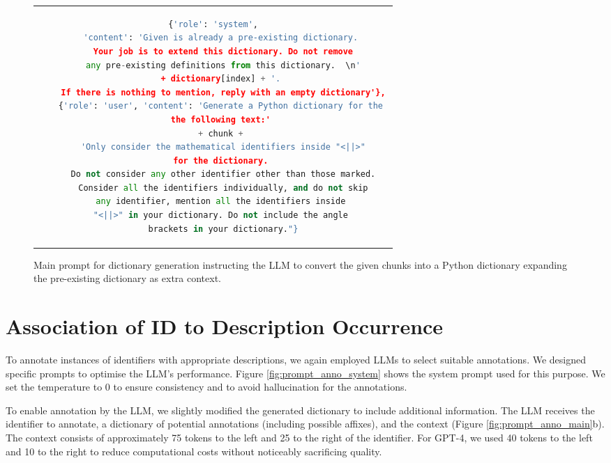 \begin{figure}[htpb]
  \centering
  \begin{tabular}{c}
  \begin{lstlisting}[language=python]
    {'role': 'system',
    'content': 'Given is already a pre-existing dictionary. 
    Your job is to extend this dictionary. Do not remove
    any pre-existing definitions from this dictionary.  \n'
    + dictionary[index] + '. 
    If there is nothing to mention, reply with an empty dictionary'},
    {'role': 'user', 'content': 'Generate a Python dictionary for the 
    the following text:' 
    + chunk + 
    'Only consider the mathematical identifiers inside "<||>"
    for the dictionary. 
    Do not consider any other identifier other than those marked.
    Consider all the identifiers individually, and do not skip
    any identifier, mention all the identifiers inside 
    "<||>" in your dictionary. Do not include the angle 
    brackets in your dictionary."}
  \end{lstlisting}
  \end{tabular}
  \caption[Main Prompt for Dictionary Generation]{Main prompt for dictionary generation instructing the LLM to convert the given chunks into a Python dictionary expanding the pre-existing dictionary as extra context.} \label{fig:prompt_dic}
\end{figure}


\section{Association of ID to Description Occurrence}\label{sec:annotation}

To annotate instances of identifiers with appropriate descriptions, we again employed \ac{LLMs} to select suitable annotations. We designed specific prompts to optimise the LLM's performance. Figure \ref{fig:prompt_anno_system} shows the system prompt used for this purpose. We set the temperature to 0 to ensure consistency and to avoid hallucination for the annotations.

To enable annotation by the LLM, we slightly modified the generated dictionary to include additional information. The LLM receives the identifier to annotate, a dictionary of potential annotations (including possible affixes), and the context (Figure \ref{fig:prompt_anno_main}b). The context consists of approximately 75 tokens to the left and 25 to the right of the identifier. For GPT-4, we used 40 tokens to the left and 10 to the right to reduce computational costs without noticeably sacrificing quality.

